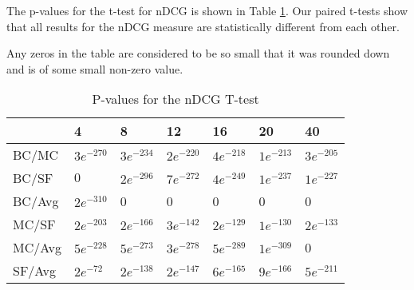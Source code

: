The p-values for the t-test for nDCG is shown in Table \ref{tbl:ndcg_ttest}. Our paired t-tests show that all results for the nDCG measure are statistically different from each other.

Any zeros in the table are considered to be so small that it was rounded down and is of some small non-zero value.

\begin{table}[H]
	\centering
	\begin{tabular}{|l|llllll|}\hline
		& 4 & 8 & 12 & 16 & 20 & 40 \\\hline
		BC/MC	& $3e^{-270}$	& $3e^{-234}$	& $2e^{-220}$	& $4e^{-218}$	& $1e^{-213}$ & $3e^{-205}$ \\
		BC/SF	& $0$	& $2e^{-296}$	& $7e^{-272}$	& $4e^{-249}$	& $1e^{-237}$ & $1e^{-227}$ \\
		BC/Avg	& $2e^{-310}$	& 0 & 0	& 0	& 0 & 0 \\
		MC/SF	& $2e^{-203}$	& $2e^{-166}$ 	& $3e^{-142}$	& $2e^{-129}$	& $1e^{-130}$ & $2e^{-133}$ \\
		MC/Avg	& $5e^{-228}$	& $5e^{-273}$ 	& $3e^{-278}$	& $5e^{-289}$	& $1e^{-309}$ & 0 \\
		SF/Avg	& $2e^{-72}$	& $2e^{-138}$ 	& $2e^{-147}$	& $6e^{-165}$	& $9e^{-166}$ & $5e^{-211}$ \\ \hline
	\end{tabular}
	\caption{P-values for the nDCG T-test}
	\label{tbl:ndcg_ttest}
\end{table}